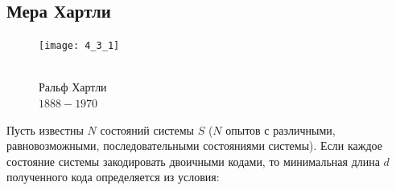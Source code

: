 \newpage
\subsection{Мера Хартли}

\begin{figure}
\texttt{[image: 4\_3\_1]}
\begin{center}
\caption{
\\\footnotesize{Ральф Хартли}
\\\footnotesize{$1888 - 1970$}}
\end{center}
\end{figure}

Пусть известны $N$ состояний системы $S$ ($N$  опытов с различными, равновозможными, последовательными состояниями системы). Если каждое состояние системы закодировать двоичными кодами, то минимальная длина $d$ полученного кода определяется из условия:

